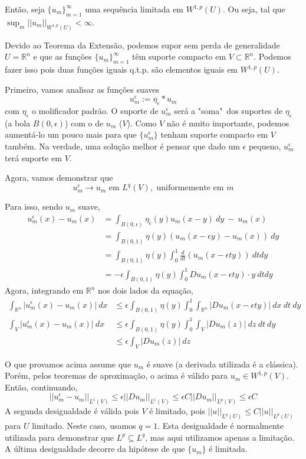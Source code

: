 \documentclass[11pt]{article}
\newcommand{\Rn}{{\mathbb{R}^n}}
\newcommand{\rn}{{\mathbb{R}^n}}
\newcommand{\e}{\epsilon}
\begin{document}
Então, seja $\{u_m\}_{m=1}^\infty$ uma sequência limitada em $W^{1,p}(U)$. Ou seja, tal que $\sup_m ||u_m||_{W^{1,p}(U)} < \infty$.

Devido ao Teorema da Extensão, podemos supor sem perda de generalidade $U=\Rn$ e que as funções $\{u_m\}_{m=1}^\infty$ têm suporte compacto em $V \subset \Rn$. Podemos fazer isso pois duas funções iguais q.t.p. são elementos iguais em $W^{1,p}(U)$.

Primeiro, vamos analisar as funções suaves \[ u_m^\e := \eta_\e * u_m \] com $ \eta_\e $ o molificador padrão.  O suporte de $u_m^\e$ será a "soma"\ dos suportes de $\eta_\e$ (a bola $B(0,\e)$) com o de $u_m$ ($V$). Como $V$ não é muito importante, podemos aumentá-lo um pouco mais para que $\{u_m^\e\}$ tenham suporte compacto em $V$ também. Na verdade, uma solução melhor é pensar que dado um $\e$ pequeno, $u_m^\e$ terá suporte em $V$.

Agora, vamos demonstrar que \[ u_m^\e \rightarrow u_m \text{ em } L^q(V), \text{ uniformemente em } m\]

Para isso, sendo $u_m$ suave, \begin{align*}
	u_m^\e(x) - u_m(x) &= \int_{B(0,\e)} \eta_\e(y)u_m(x-y)\ dy\  -\  u_m(x)\\
	&= \int_{B(0,1)} \eta(y)\left(u_m(x-\e y) - u_m(x)\right)\ dy\\
	&=  \int_{B(0,1)} \eta(y) \int_0^1 \frac{d}{dt} (u_m(x-\e t y))\ dtdy \\
	&=  -\e \int_{B(0,1)} \eta(y) \int_0^1 Du_m(x - \e t y)\cdot y\ dtdy
\end{align*}
Agora, integrando em $\rn$ nos dois lados da equação, \begin{align*}
	\int_\Rn |	u_m^\e(x) - u_m(x) |\ dx &\leq \e  \int_{B(0,1)} \eta(y) \int_0^1 \int_\Rn  |Du_m(x - \e t y)|\ dx\ dt\ dy\\
	\int_V |	u_m^\e(x) - u_m(x) |\ dx &\leq \e  \int_{B(0,1)} \eta(y) \int_0^1 \int_V  |Du_m(z)|\ dz\ dt\ dy\\
	&\leq \e \int_V |Du_m(z)| \ dz
\end{align*}

O que provamos acima assume que $u_m$ é suave (a derivada utilizada
 é a clássica). Porém, pelos teoremas de aproximação, o acima é válido para $u_m \in W^{1,p}(V)$. Então, continuando,\[ 
	||u_m^\e - u_m||_{L^1(V)} \leq \e ||Du_m||_{L^1(V)} \leq \e C ||Du_m||_{L^p(V)} \leq \e C \]
A segunda desigualdade é válida pois $V$ é limitado, pois $||u||_{L^q(U)} \leq C ||u||_{L^p(U)}$ para $U$ limitado. Neste caso, usamos $q=1$. Esta desigualdade é normalmente utilizada para demonstrar que $L^p \subseteq L^q$, mas aqui utilizamos apenas a limitação. A última desigualdade decorre da hipótese de que $\{u_m\}$ é limitada.
\end{document}
